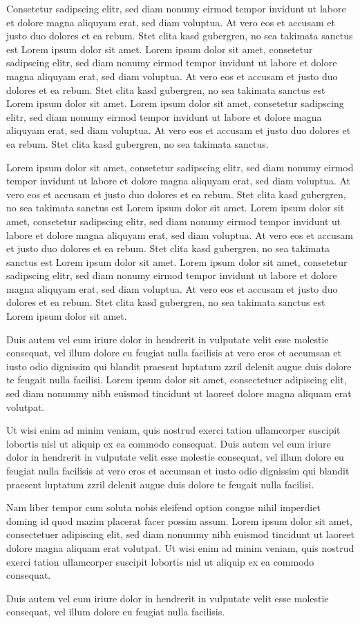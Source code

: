 Consetetur sadipscing elitr, sed diam nonumy eirmod tempor invidunt ut labore et dolore magna aliquyam erat, sed diam voluptua. At vero eos et accusam et justo duo dolores et ea rebum. Stet clita kasd gubergren, no sea takimata sanctus est Lorem ipsum dolor sit amet. Lorem ipsum dolor sit amet, consetetur sadipscing elitr, sed diam nonumy eirmod tempor invidunt ut labore et dolore magna aliquyam erat, sed diam voluptua. At vero eos et accusam et justo duo dolores et ea rebum. Stet clita kasd gubergren, no sea takimata sanctus est Lorem ipsum dolor sit amet. Lorem ipsum dolor sit amet, consetetur sadipscing elitr, sed diam nonumy eirmod tempor invidunt ut labore et dolore magna aliquyam erat, sed diam voluptua. At vero eos et accusam et justo duo dolores et ea rebum. Stet clita kasd gubergren, no sea takimata sanctus.  

Lorem ipsum dolor sit amet, consetetur sadipscing elitr, sed diam nonumy eirmod tempor invidunt ut labore et dolore magna aliquyam erat, sed diam voluptua. At vero eos et accusam et justo duo dolores et ea rebum. Stet clita kasd gubergren, no sea takimata sanctus est Lorem ipsum dolor sit amet. Lorem ipsum dolor sit amet, consetetur sadipscing elitr, sed diam nonumy eirmod tempor invidunt ut labore et dolore magna aliquyam erat, sed diam voluptua. At vero eos et accusam et justo duo dolores et ea rebum. Stet clita kasd gubergren, no sea takimata sanctus est Lorem ipsum dolor sit amet. Lorem ipsum dolor sit amet, consetetur sadipscing elitr, sed diam nonumy eirmod tempor invidunt ut labore et dolore magna aliquyam erat, sed diam voluptua. At vero eos et accusam et justo duo dolores et ea rebum. Stet clita kasd gubergren, no sea takimata sanctus est Lorem ipsum dolor sit amet.  

Duis autem vel eum iriure dolor in hendrerit in vulputate velit esse molestie consequat, vel illum dolore eu feugiat nulla facilisis at vero eros et accumsan et iusto odio dignissim qui blandit praesent luptatum zzril delenit augue duis dolore te feugait nulla facilisi. Lorem ipsum dolor sit amet, consectetuer adipiscing elit, sed diam nonummy nibh euismod tincidunt ut laoreet dolore magna aliquam erat volutpat.  

Ut wisi enim ad minim veniam, quis nostrud exerci tation ullamcorper suscipit lobortis nisl ut aliquip ex ea commodo consequat. Duis autem vel eum iriure dolor in hendrerit in vulputate velit esse molestie consequat, vel illum dolore eu feugiat nulla facilisis at vero eros et accumsan et iusto odio dignissim qui blandit praesent luptatum zzril delenit augue duis dolore te feugait nulla facilisi.  

Nam liber tempor cum soluta nobis eleifend option congue nihil imperdiet doming id quod mazim placerat facer possim assum. Lorem ipsum dolor sit amet, consectetuer adipiscing elit, sed diam nonummy nibh euismod tincidunt ut laoreet dolore magna aliquam erat volutpat. Ut wisi enim ad minim veniam, quis nostrud exerci tation ullamcorper suscipit lobortis nisl ut aliquip ex ea commodo consequat.  

Duis autem vel eum iriure dolor in hendrerit in vulputate velit esse molestie consequat, vel illum dolore eu feugiat nulla facilisis.   